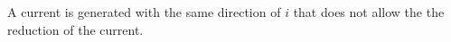 A current is generated with the same direction of $i$ 
that does not allow the 
the reduction of the current.